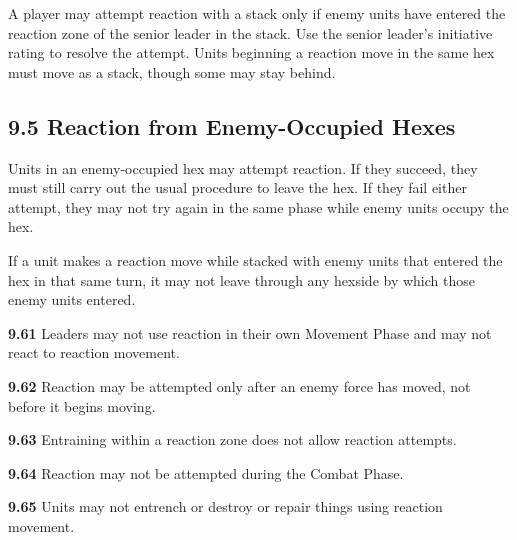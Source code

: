
A player may attempt reaction with a stack only if enemy units have entered the reaction zone of the senior leader in the stack. Use the senior leader's initiative rating to resolve the attempt. Units beginning a reaction move in the same hex must move as a stack, though some may stay behind.

\subsection[{\texorpdfstring{\protect\shortstack[l]{9.5 Reaction from Enemy\\\hspace*{1.55em}-Occupied Hexes}}{9.5 Reaction from Enemy-Occupied Hexes}}]{9.5 Reaction from Enemy-Occupied Hexes}

Units in an enemy-occupied hex may attempt reaction. If they succeed, they must still carry out the usual procedure to leave the hex. If they fail either attempt, they may not try again in the same phase while enemy units occupy the hex.

If a unit makes a reaction move while stacked with enemy units that entered the hex in that same turn, it may not leave through any hexside by which those enemy units entered.


\textbf{9.61} Leaders may not use reaction in their own Movement Phase and may not react to reaction movement.

\textbf{9.62} Reaction may be attempted only after an enemy force has moved, not before it begins moving.

\textbf{9.63} Entraining within a reaction zone does not allow reaction attempts.

\textbf{9.64} Reaction may not be attempted during the Combat Phase.

\textbf{9.65} Units may not entrench or destroy or repair things using reaction movement.
